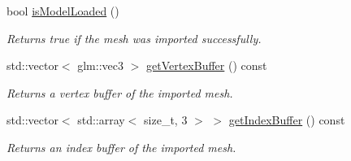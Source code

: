 \begin{DoxyCompactItemize}
\mbox{\label{classpepr3d_1_1_model_importer_a49b8a0fd779eedce1cf24a910fcce833}} 
bool \mbox{\hyperlink{classpepr3d_1_1_model_importer_a49b8a0fd779eedce1cf24a910fcce833}{is\+Model\+Loaded}} ()
\begin{DoxyCompactList}\small\item\em Returns true if the mesh was imported successfully. \end{DoxyCompactList}\item 
\mbox{\label{classpepr3d_1_1_model_importer_a8b27edc2cd72882c9144ff870ee26a6b}} 
std\+::vector$<$ glm\+::vec3 $>$ \mbox{\hyperlink{classpepr3d_1_1_model_importer_a8b27edc2cd72882c9144ff870ee26a6b}{get\+Vertex\+Buffer}} () const
\begin{DoxyCompactList}\small\item\em Returns a vertex buffer of the imported mesh. \end{DoxyCompactList}\item 
\mbox{\label{classpepr3d_1_1_model_importer_a0d21b9019f26f672414ad0bb40bb946c}} 
std\+::vector$<$ std\+::array$<$ size\+\_\+t, 3 $>$ $>$ \mbox{\hyperlink{classpepr3d_1_1_model_importer_a0d21b9019f26f672414ad0bb40bb946c}{get\+Index\+Buffer}} () const
\begin{DoxyCompactList}\small\item\em Returns an index buffer of the imported mesh. \end{DoxyCompactList}\end{DoxyCompactItemize}
